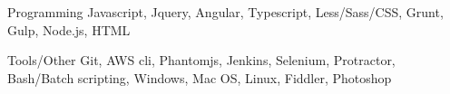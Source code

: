 

\begin{cvskills}

  \cvskill
    {Programming} %
    {Javascript, Jquery, Angular, Typescript, Less/Sass/CSS, Grunt, Gulp, Node.js, HTML} %

  \cvskill
    {Tools/Other} %
    {Git, AWS cli, Phantomjs, Jenkins, Selenium, Protractor, Bash/Batch scripting, Windows, Mac OS, Linux, Fiddler, Photoshop} %

\end{cvskills}